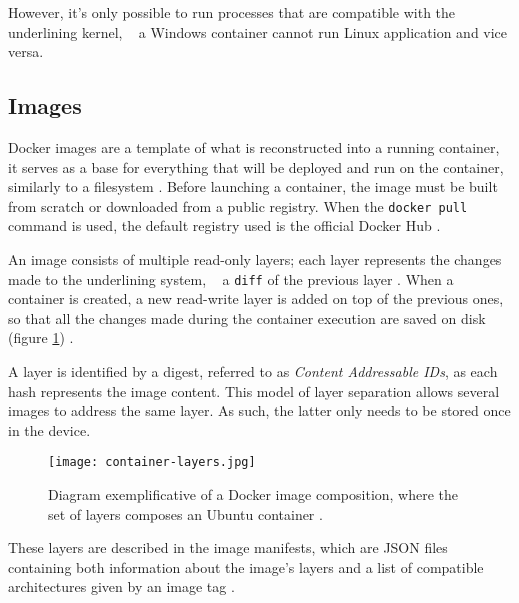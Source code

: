 However, it's only possible to run processes that are compatible with the underlining kernel, \ie~ a Windows container cannot run Linux application and vice versa.




\subsection{Images}
\label{sec::arch:images}
Docker images are a template of what is reconstructed into a running container, it serves as a base for everything that will be deployed and run on the container, similarly to a filesystem \cite{Kane2018-fn}. Before launching a container, the image must be built from scratch or downloaded from a public registry. When the \texttt{docker pull} command is used, the default registry used is the official Docker Hub \cite{docker-hub}.

An image consists of multiple read-only layers; each layer represents the changes made to the underlining system, \ie~ a \texttt{diff} of the previous layer \cite{images-layers}. When a container is created, a new read-write layer is added on top of the previous ones, so that all the changes made during the container execution are saved on disk (figure \ref{fig:docker-image}) \cite{fig-src:image-layers}.

A layer is identified by a digest, referred to as \textit{Content Addressable IDs}, as each hash represents the image content. This model of layer separation allows several images to address the same layer. As such, the latter only needs to be stored once in the device.

\begin{figure}[!htb]
    \centering
    \texttt{[image: container-layers.jpg]}
    \caption{Diagram exemplificative of a Docker image composition, where the set of layers composes an Ubuntu container \cite{fig-src:image-layers}.}
    \label{fig:docker-image}
\end{figure}

These layers are described in the image manifests, which are \acs{JSON} files containing both information about the image's layers and a list of compatible architectures given by an image tag \cite{image-manifest}.

